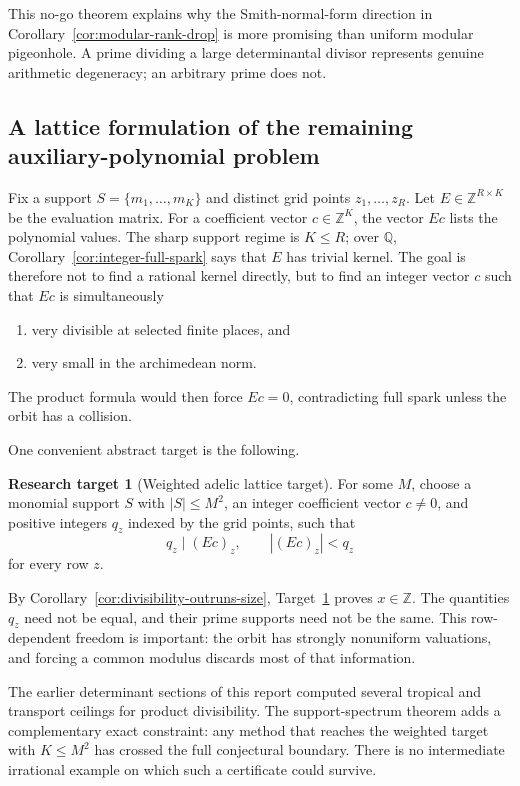 \documentclass[11pt,oneside]{article}
\theoremstyle{definition}
\newtheorem{target}[theorem]{Research target}
\theoremstyle{remark}
\newcommand{\Z}{\mathbb Z}
\newcommand{\Q}{\mathbb Q}
\begin{document}
This no-go theorem explains why the Smith-normal-form direction in
Corollary~\ref{cor:modular-rank-drop} is more promising than uniform modular pigeonhole.  A
prime dividing a large determinantal divisor represents genuine arithmetic degeneracy; an
arbitrary prime does not.

\subsection{A lattice formulation of the remaining auxiliary-polynomial problem}
\label{sec:sparse-lattice}

Fix a support $S=\{m_1,\dots,m_K\}$ and distinct grid points
$z_1,\dots,z_R$.  Let $E\in\Z^{R\times K}$ be the evaluation matrix.  For a coefficient
vector $c\in\Z^K$, the vector $Ec$ lists the polynomial values.  The sharp support regime is
$K\le R$; over $\Q$, Corollary~\ref{cor:integer-full-spark} says that $E$ has trivial kernel.
The goal is therefore not to find a rational kernel directly, but to find an integer vector
$c$ such that $Ec$ is simultaneously
\begin{enumerate}
\item very divisible at selected finite places, and
\item very small in the archimedean norm.
\end{enumerate}
The product formula would then force $Ec=0$, contradicting full spark unless the orbit has a
collision.

One convenient abstract target is the following.

\begin{target}[Weighted adelic lattice target]
\label{target:weighted-adelic}
For some $M$, choose a monomial support $S$ with $|S|\le M^2$, an integer coefficient vector
$c\ne0$, and positive integers $q_z$ indexed by the grid points, such that
\[
  q_z\mid (Ec)_z,
  \qquad
  |(Ec)_z|<q_z
\]
for every row $z$.
\end{target}

By Corollary~\ref{cor:divisibility-outruns-size}, Target~\ref{target:weighted-adelic} proves
$x\in\Z$.  The quantities $q_z$ need not be equal, and their prime supports need not be the
same.  This row-dependent freedom is important: the orbit has strongly nonuniform
valuations, and forcing a common modulus discards most of that information.

The earlier determinant sections of this report computed several tropical and transport
ceilings for product divisibility.  The support-spectrum theorem adds a complementary exact
constraint: any method that reaches the weighted target with $K\le M^2$ has crossed the full
conjectural boundary.  There is no intermediate irrational example on which such a
certificate could survive.
\end{document}
